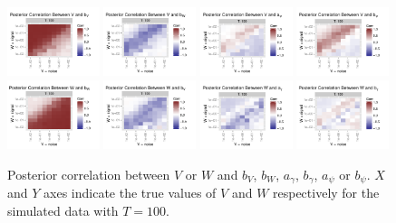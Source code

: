 \documentclass{article}
\begin{document}
\begin{figure}[!ht]
\centering
\includegraphics[width=0.24\textwidth]{corplot1}
\includegraphics[width=0.24\textwidth]{corplot2}
\includegraphics[width=0.24\textwidth]{corplot3}
\includegraphics[width=0.24\textwidth]{corplot4}
\includegraphics[width=0.24\textwidth]{corplot5}
\includegraphics[width=0.24\textwidth]{corplot6}
\includegraphics[width=0.24\textwidth]{corplot7}
\includegraphics[width=0.24\textwidth]{corplot8}
\caption{Posterior correlation between $V$ or $W$ and $b_V$, $b_W$, $a_\gamma$, $b_\gamma$, $a_\psi$ or $b_\psi$. $X$ and $Y$ axes indicate the true values of $V$ and $W$ respectively for the simulated data with $T=100$.}
\label{corplot}
\end{figure}
\end{document}
